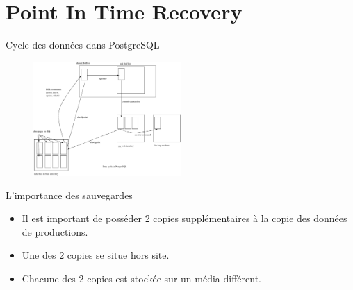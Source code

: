 \section{Point In Time Recovery}



\begin{frame}{Cycle des données dans PostgreSQL}

\begin{figure}
\begin{center}
\includegraphics[angle=0, width=0.5\textwidth]{images/internals.eps}
\end{center}
\end{figure}

\begin{toile}
\end{toile}

\end{frame}


\begin{frame}{L'importance des sauvegardes}

\begin{itemize}

\item Il est important de posséder 2 copies supplémentaires à la copie des données de productions.
\item Une des 2 copies se situe hors site.
\item Chacune des 2 copies est stockée sur un média différent.

\end{itemize}

\begin{toile}
\end{toile}

\end{frame}


